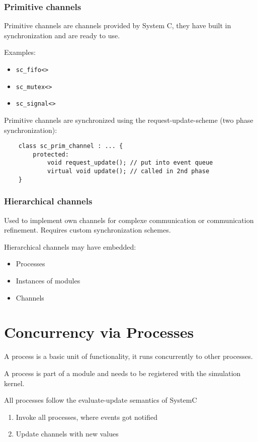 \subsubsection{Primitive channels}
Primitive channels are channels provided by System C, they have built in synchronization and are ready to use.

Examples:
\begin{itemize}
    \item \lstinline{sc_fifo<>}
    \item \lstinline{sc_mutex<>}
    \item \lstinline{sc_signal<>}
\end{itemize}

Primitive channels are synchronized using the request-update-scheme (two phase synchronization):
\begin{lstlisting}
    class sc_prim_channel : ... {
        protected:
            void request_update(); // put into event queue
            virtual void update(); // called in 2nd phase
    }
\end{lstlisting}

\subsubsection{Hierarchical channels}
Used to implement own channels for complexe communication or communication refinement.
Requires custom synchronization schemes.

Hierarchical channels may have embedded:
\begin{itemize}
    \item Processes
    \item Instances of modules
    \item Channels
\end{itemize}

\section{Concurrency via Processes}
A process is a basic unit of functionality, it runs concurrently to other processes.

A process is part of a module and needs to be registered with the simulation kernel.

All processes follow the evaluate-update semantics of SystemC
\begin{enumerate}
    \item Invoke all processes, where events got notified
    \item Update channels with new values
\end{enumerate}

